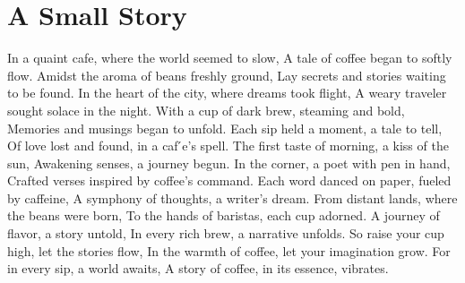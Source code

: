 \documentclass[12pt, a4paper]{article}
\begin{document}
\section{A Small Story}
\begin{multicols}{2}
    \FlushRight
In a quaint cafe, where the world seemed to slow,
A tale of coffee began to softly flow.
Amidst the aroma of beans freshly ground,
Lay secrets and stories waiting to be found.
In the heart of the city, where dreams took flight,
A weary traveler sought solace in the night.
With a cup of dark brew, steaming and bold,
Memories and musings began to unfold.
Each sip held a moment, a tale to tell,
Of love lost and found, in a caf ́e’s spell.
The first taste of morning, a kiss of the sun,
Awakening senses, a journey begun.
In the corner, a poet with pen in hand,
Crafted verses inspired by coffee’s command.
Each word danced on paper, fueled by caffeine,
A symphony of thoughts, a writer’s dream.
From distant lands, where the beans were born,
To the hands of baristas, each cup adorned.
A journey of flavor, a story untold,
In every rich brew, a narrative unfolds.
So raise your cup high, let the stories flow,
In the warmth of coffee, let your imagination grow.
For in every sip, a world awaits,
A story of coffee, in its essence, vibrates.
\end{multicols}
\end{document}
